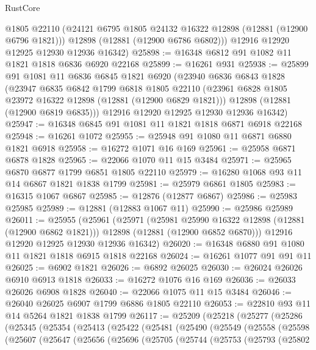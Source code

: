 \begin{lexlean}{RustCore}
\begin{coremodule}
        @1805
        @22110
        (@24121 @6795 @1805 @24132 @16322 @12898 (@12881 (@12900 @6796 @1821)))
        @12898
        (@12881 (@12900 @6786 @6802)))
      @12916
      @12920
      @12925
      @12930
      @12936
      @16342)
@25898 := @16348 @6812 @91 @1082 @11 @1821 @1818 @6836 @6920 @22168
@25899 := @16261 @931
@25938 := @25899
    @91
    @1081
    @11
    @6836
    @6845
    @1821
    @6920
    (@23940
      @6836
      @6843
      @1828
      (@23947
        @6835
        @6842
        @1799
        @6818
        @1805
        @22110
        (@23961 @6828 @1805 @23972 @16322 @12898 (@12881 (@12900 @6829 @1821)))
        @12898
        (@12881 (@12900 @6819 @6835)))
      @12916
      @12920
      @12925
      @12930
      @12936
      @16342)
@25947 := @16348 @6845 @91 @1081 @11 @1821 @1818 @6871 @6918 @22168
@25948 := @16261 @1072
@25955 := @25948 @91 @1080 @11 @6871 @6880 @1821 @6918
@25958 := @16272 @1071 @16 @169
@25961 := @25958 @6871 @6878 @1828
@25965 := @22066 @1070 @11 @15 @3484
@25971 := @25965 @6870 @6877 @1799 @6851 @1805 @22110
@25979 := @16280 @1068 @93 @11 @14 @6867 @1821 @1838 @1799
@25981 := @25979 @6861 @1805
@25983 := @16315 @1067 @6867
@25985 := @12876 (@12877 @6867)
@25986 := @25983 @25985
@25989 := @12881 (@12883 @1067 @11)
@25990 := @25986 @25989
@26011 := @25955
    (@25961
      (@25971
        (@25981 @25990 @16322 @12898 (@12881 (@12900 @6862 @1821)))
        @12898
        (@12881 (@12900 @6852 @6870)))
      @12916
      @12920
      @12925
      @12930
      @12936
      @16342)
@26020 := @16348 @6880 @91 @1080 @11 @1821 @1818 @6915 @1818 @22168
@26024 := @16261 @1077 @91 @91 @11
@26025 := @6902 @1821
@26026 := @6892 @26025
@26030 := @26024 @26026 @6910 @6913 @1818
@26033 := @16272 @1076 @16 @169
@26036 := @26033 @26026 @6908 @1828
@26040 := @22066 @1075 @11 @15 @3484
@26046 := @26040 @26025 @6907 @1799 @6886 @1805 @22110
@26053 := @22810 @93 @11 @14 @5264 @1821 @1838 @1799
@26117 := @25209
    (@25218
      (@25277
        (@25286
          (@25345
            (@25354
              (@25413
                (@25422
                  (@25481
                    (@25490
                      (@25549
                        (@25558
                          (@25598
                            (@25607
                              (@25647
                                (@25656
                                  (@25696
                                    (@25705
                                      (@25744
                                        (@25753
                                          (@25793
                                            (@25802

\end{coremodule}
\end{lexlean}
